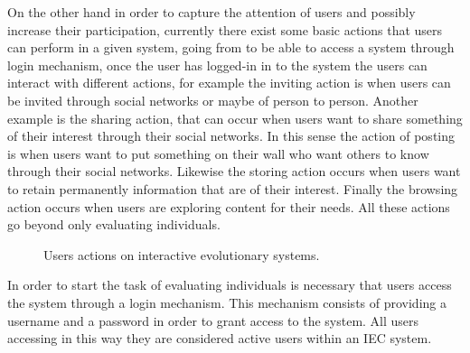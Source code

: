 On the other hand in order to capture the attention of users and possibly
increase their participation, currently there exist some basic actions that
users can perform in a given system, going from to be able to access a system
through login mechanism, once the user has logged-in in to the system the
users can interact with different actions, for example the inviting action is
when users can be invited through social networks or maybe of person to
person. Another example is the sharing action, that can occur when users want
to share something of their interest through their social networks. In this sense the action of posting is when
users want to put something on their wall who want others to know through
their social networks. Likewise the storing action occurs when users want to
retain permanently information that are of their interest. Finally the
browsing action occurs when users are exploring content for their needs. All
these actions go beyond only evaluating individuals.

\begin{figure}
	\captionsetup{justification=centering,margin=2cm}
	\centering
	\setlength\fboxsep{0pt}
	\setlength\fboxrule{0.7pt}
	\caption{Users actions on interactive evolutionary systems.}
	\label{fig:users}       
\end{figure}

In order to start the task of evaluating individuals is necessary that users
access the system through a login mechanism. This mechanism consists of
providing a username and a password in order to grant access to the system. All
users accessing in this way they are considered active users within an IEC
system.

